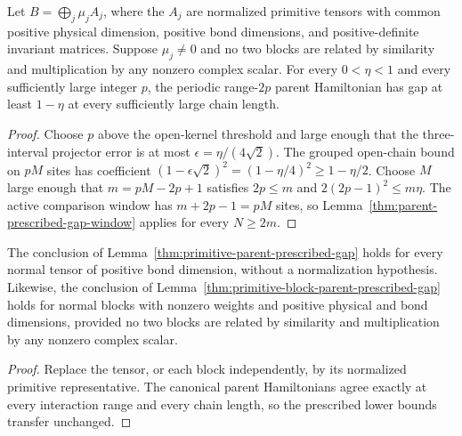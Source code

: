 \begin{lemma}
    \label{thm:primitive-block-parent-prescribed-gap}
    \leanok
    Let $B=\bigoplus_j\mu_jA_j$, where the $A_j$ are normalized
    primitive tensors with common positive physical dimension, positive
    bond dimensions, and positive-definite invariant matrices. Suppose
    $\mu_j\ne0$ and no two blocks are related by similarity and
    multiplication by any nonzero complex scalar.
    For every $0<\eta<1$ and every sufficiently large integer $p$,
    the periodic range-$2p$ parent Hamiltonian has gap at least
    $1-\eta$ at every sufficiently large chain length.
\end{lemma}
\begin{proof}
    \leanok
    Choose $p$ above the open-kernel threshold and large enough that
    the three-interval projector error is at most
    $\epsilon=\eta/(4\sqrt2)$. The grouped open-chain bound on
    $pM$ sites has coefficient
    $(1-\epsilon\sqrt2)^2=(1-\eta/4)^2\ge1-\eta/2$.
    Choose $M$ large enough that $m=pM-2p+1$ satisfies
    $2p\le m$ and $2(2p-1)^2\le m\eta$.
    The active comparison window has $m+2p-1=pM$ sites, so
    Lemma~\ref{thm:parent-prescribed-gap-window} applies for every
    $N\ge2m$.
\end{proof}

\begin{lemma}
    \label{thm:normal-parent-prescribed-gap}
    \leanok
    The conclusion of Lemma~\ref{thm:primitive-parent-prescribed-gap}
    holds for every normal tensor of positive bond dimension, without
    a normalization hypothesis. Likewise, the conclusion of
    Lemma~\ref{thm:primitive-block-parent-prescribed-gap} holds for
    normal blocks with nonzero weights and positive physical and bond
    dimensions, provided no two blocks are related by similarity and
    multiplication by any nonzero complex scalar.
\end{lemma}
\begin{proof}
    \leanok
    Replace the tensor, or each block independently, by its normalized
    primitive representative. The canonical parent Hamiltonians agree
    exactly at every interaction range and every chain length, so the
    prescribed lower bounds transfer unchanged.
\end{proof}

